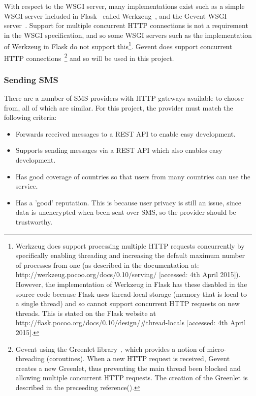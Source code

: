 \documentclass[authoryearcitations]{UoYCSproject}
\begin{document}
With respect to the WSGI server, many implementations exist such as a simple WSGI server included in Flask~\cite{libraryFlask} called Werkzeug~\cite{libraryWerkzeug}, and the Gevent WSGI server~\cite{libraryGevent}.  Support for multiple concurrent HTTP connections is not a requirement in the WSGI specification, and so some WSGI servers such as the implementation of Werkzeug in Flask do not support this\footnote{Werkzeug does support processing multiple HTTP requests concurrently by specifically enabling threading and increasing the default maximum number of processes from one (as described in the documentation at: http://werkzeug.pocoo.org/docs/0.10/serving/ [accessed: 4th April 2015]). However, the implementation of Werkzeug in Flask has these disabled in the source code because Flask uses thread-local storage (memory that is local to a single thread) and so cannot support concurrent HTTP requests on new threads. This is stated on the Flask website at http://flask.pocoo.org/docs/0.10/design/\#thread-locals [accessed: 4th April 2015].}. Gevent does support concurrent HTTP connections~\cite{geventImplementingServers}\footnote{Gevent using the Greenlet library~\cite{libraryGreenlet}, which provides a notion of micro-threading (coroutines). When a new HTTP request is received, Gevent creates a new Greenlet, thus preventing the main thread been blocked and allowing multiple concurrent HTTP requests. The creation of the Greenlet is described in the preceeding reference(\cite{geventImplementingServers}).} and so will be used in this project.


\subsubsection{Sending SMS}
There are a number of SMS providers with HTTP gateways available to choose from, all of which are similar. For this project, the provider must match the following criteria:
\begin{itemize}
  \item Forwards received messages to a REST API to enable easy development.
  \item Supports sending messages via a REST API which also enables easy development.
  \item Has good coverage of countries so that users from many countries can use the service.
  \item Has a 'good' reputation. This is because user privacy is still an issue, since data is unencrypted when been sent over SMS, so the provider should be trustworthy.
\end{itemize}
\end{document}
